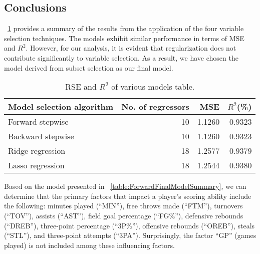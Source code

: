 \subsection{Conclusions}

\Tab~\ref{table:RegEvalParams} provides a summary of the results from the application of the four variable selection techniques.
The models exhibit similar performance in terms of MSE and $R^2$. 
However, for our analysis, it is evident that regularization does not contribute significantly to variable selection. 
As a result, we have chosen the model derived from subset selection as our final model.

\begin{table}[H]
	\centering
	\begin{tabular}{|| l | r | r | r ||} 
		\hline
		Model selection algorithm & No. of regressors & MSE & $R^2$(\%) \\
		\hline
		Forward stepwise & 10 & 1.1260 & 0.9323 \\
		\hline
		Backward stepwise & 10 & 1.1260 & 0.9323 \\
		\hline
		Ridge regression & 18 & 1.2577 & 0.9379 \\
		\hline
		Lasso regression & 18 & 1.2544 & 0.9380 \\
		\hline
	\end{tabular}
	\caption{RSE and $R^2$ of various models table.}
	\label{table:RegEvalParams}
\end{table}

Based on the model presented in \Tab~\ref{table:ForwardFinalModelSummary}, we can determine that the primary factors that impact a player's scoring ability include the following: minutes played (``MIN''), free throws made (``FTM''), turnovers (``TOV''), assists (``AST''), field goal percentage (``FG\%''), defensive rebounds (``DREB''), three-point percentage (``3P\%''), offensive rebounds (``OREB''), steals (``STL''), and three-point attempts (``3PA'').
Surprisingly, the factor ``GP'' (games played) is not included among these influencing factors.
